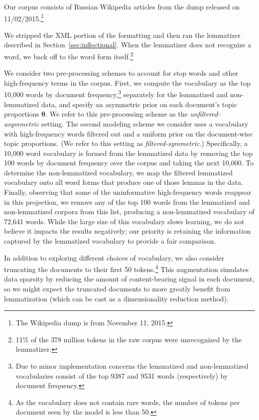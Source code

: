 \documentclass[11pt,letterpaper]{article}
\renewcommand{\vec}{\boldsymbol}   %
\newcommand{\vtheta}{{\vec{\theta}}}
\begin{document}
{Our corpus consists of Russian Wikipedia articles from the dump
released on 11/02/2015.\footnote{The Wikipedia dump is from November 11, 2015.}

}
We stripped the XML portion of the formatting and then ran the
lemmatizer described in Section~\ref{sec:inflectional}.  When the
lemmatizer does not recognize a word, we back off to the word form
itself.\footnote{
    11\% of the 378 million tokens in the raw corpus were
    unrecognized by the lemmatizer.
}

We consider two pre-processing schemes to account for stop words and
other high-frequency terms in the corpus.  First, we compute the
vocabulary as the top 10,000 words by document frequency,\footnote{
    Due to minor implementation concerns the lemmatized and
    non-lemmatized vocabularies consist of the top 9387 and 9531 words
    (respectively) by document frequency.
}
separately for the lemmatized and non-lemmatized data, and
specify an asymmetric prior on each document's topic proportions
$\vtheta$.
We refer to this pre-processing scheme
as the \emph{unfiltered-asymmetric} setting.  The second modeling scheme we
consider uses a vocabulary with high-frequency words filtered out and a
uniform prior on the document-wise topic proportions.
(We refer to this setting as \emph{filtered-symmetric}.)
Specifically, a 10,000 word vocabulary is formed from the
lemmatized data by removing the top 100 words by document frequency
over the corpus and taking the next 10,000.  To determine the
non-lemmatized vocabulary, we map the filtered lemmatized
vocabulary onto all word forms that produce one of those lemmas in
the data.  Finally, observing that some of the uninformative
high-frequency words reappear in this projection, we remove any
of the top 100 words from the lemmatized and non-lemmatized corpora
from this list, producing a non-lemmatized vocabulary of 72,641 words.
While the large size of this vocabulary slows learning,
we do not believe it impacts the results negatively;
our priority is retaining the information captured by the lemmatized
vocabulary to provide a fair comparison.

In addition to exploring different choices of vocabulary, we also
consider truncating the documents to their first 50 tokens.\footnote{
    As the vocabulary does not contain rare words, the number of
    tokens per document seen by the model is less than 50.
}
This augmentation simulates data sparsity by reducing the amount of
content-bearing signal in each document, so we might expect the
truncated documents to more greatly benefit from lemmatization (which
can be cast as a dimensionality reduction method).
\end{document}
